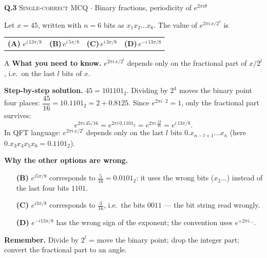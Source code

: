 \documentclass[11pt,a4paper]{article}
\newcommand{\optlabel}[1]{\textbf{(#1)}}
\newcommand{\correctlabel}[1]{\textcolor{okgreen}{\textbf{(#1)}\,\ding{51}}}
\newenvironment{qitem}[1]{\begin{list}{}{\setlength{\leftmargin}{3.3em}\setlength{\labelwidth}{3.1em}%
  \setlength{\labelsep}{0.2em}\setlength{\topsep}{3pt}\setlength{\parsep}{3pt}}\item[\textbf{Q.#1}\hfill]}{\end{list}}
\newcommand{\qsep}{\par\vspace{2pt}{\color{black!15}\hrule}\vspace{4pt}}
\newcommand{\qmeta}[2]{{\footnotesize\color{black!60}\textsc{#1} \;$\cdot$\; #2}\par}
\begin{document}
\begin{qitem}{3}
\qmeta{Single-correct MCQ}{Binary fractions, periodicity of $e^{2\pi i\theta}$}
Let $x = 45$, written with $n = 6$ bits as $x_1x_2\dots x_6$. The value of $e^{2\pi i\,x/2^4}$ is
\par\smallskip\noindent\begin{tabularx}{\linewidth}{@{}*{4}{L}@{}}
\correctlabel{A}\,$e^{i\,13\pi/8}$ & \optlabel{B}\,$e^{i\,5\pi/8}$ & \optlabel{C}\,$e^{i\,3\pi/8}$ & \optlabel{D}\,$e^{-i\,13\pi/8}$
\end{tabularx}
\end{qitem}
\begin{solbox}{A}
\textbf{\color{brand}What you need to know.} $e^{2\pi i\,x/2^l}$ depends only on the fractional part of $x/2^l$, i.e.\ on the last $l$ bits of $x$.

\textbf{\color{brand}Step-by-step solution.} $45 = 101101_2$. Dividing by $2^4$ moves the binary point four places: $\dfrac{45}{16} = 10.1101_2 = 2 + 0.8125$.
Since $e^{2\pi i\cdot 2} = 1$, only the fractional part survives:
\[ e^{2\pi i\,45/16} = e^{2\pi i\,0.1101_2} = e^{2\pi i\,\frac{13}{16}} = e^{i\,13\pi/8}. \]
In QFT language: $e^{2\pi i\,x/2^l}$ depends only on the last $l$ bits $0.x_{n-l+1}\dots x_n$ (here $0.x_3x_4x_5x_6 = 0.1101_2$).

\textbf{\color{brand}Why the other options are wrong.}
\begin{itemize}[leftmargin=2.4em, itemsep=1pt, topsep=2pt]
\item[\textbf{(B)}] $e^{i5\pi/8}$ corresponds to $\frac{5}{16} = 0.0101_2$: it uses the wrong bits ($x_2\dots$) instead of the last four bits $1101$.
\item[\textbf{(C)}] $e^{i3\pi/8}$ corresponds to $\frac{3}{16}$, i.e.\ the bits $0011$ --- the bit string read wrongly.
\item[\textbf{(D)}] $e^{-i13\pi/8}$ has the wrong sign of the exponent; the convention uses $e^{+2\pi i\dots}$.
\end{itemize}
\textbf{\color{brand}Remember.} Divide by $2^l$ = move the binary point; drop the integer part; convert the fractional part to an angle.
\end{solbox}
\qsep
\end{document}
